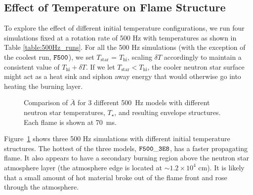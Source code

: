 \documentclass[preprint,times,tighten]{aastex63}
\begin{document}
\subsection{Effect of Temperature on Flame Structure}\label{ssec:temp_structure}

To explore the effect of different initial temperature configurations, we run four simulations fixed at a rotation rate of 500 Hz with temperatures as shown in Table \ref{table:500Hz_runs}. For all the 500 Hz simulations (with the exception of the coolest run, $\tt{F500}$), we set $T_\mathrm{star}$ = $T_\mathrm{hi}$, scaling $\delta T$ accordingly to maintain a consistent value of $T_\mathrm{hi} + \delta T$. If we let $T_\mathrm{star} < T_\mathrm{hi}$, the cooler neutron star surface might act as a heat sink and siphon away energy that would otherwise go into heating the burning layer.

\begin{figure}[t]
\centering
{}
\caption{\label{fig:compare_500Hz_abar} Comparison of $\bar{A}$ for 3 different 500~Hz models with different neutron star temperatures, $T_\star$, and resulting envelope structures.  Each flame is shown at 70~ms.} %
\end{figure}

Figure~\ref{fig:compare_500Hz_abar} shows three 500 Hz simulations with different initial temperature structures. The hottest of the three models, $\tt{F500\_3E8}$, has a faster propagating flame. It also appears to have a secondary burning region above the neutron star atmosphere layer (the atmosphere edge is located at $\sim 1.2\times 10^4$ cm). It is likely that a small amount of hot material broke out of the flame front and rose through the atmosphere.
\end{document}
